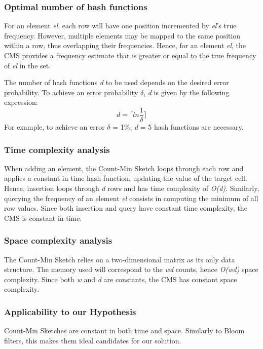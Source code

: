 \subsubsection*{Optimal number of hash functions} 
For an element \textit{el}, each row will have one position incremented by \textit{el}'s true frequency. However, multiple elements may be mapped to the same position within a row, thus overlapping their frequencies. Hence, for an element \textit{el}, the CMS provides a frequency estimate that is greater or equal to the true frequency of \textit{el} in the set.

The number of hash functions \textit{d} to be used depends on the desired error probability. To achieve an error probability $\delta$, \textit{d} is given by the following expression:
\begin{equation}
    d = \lceil ln \frac{1}{\delta} \rceil
\end{equation}
For example, to achieve an error $\delta$ = 1\%, \textit{d} = 5 hash functions are necessary.

\subsubsection*{Time complexity analysis}
When adding an element, the Count-Min Sketch loops through each row and applies a constant in time hash function, updating the value of the target cell. Hence, insertion loops through \textit{d} rows and has time complexity of \textit{O(d)}. Similarly, querying the frequency of an element \textit{el} consists in computing the minimum of all row values. Since both insertion and query have constant time complexity, the CMS is constant in time.

\subsubsection*{Space complexity analysis}
The Count-Min Sketch relies on a two-dimensional matrix as its only data structure. The memory used will correspond to the \textit{wd} counts, hence \textit{O(wd)} space complexity. Since both \textit{w} and \textit{d} are constants, the CMS has constant space complexity.

\subsubsection*{Applicability to our Hypothesis}
Count-Min Sketches are constant in both time and space. Similarly to Bloom filters, this makes them ideal candidates for our solution. 

